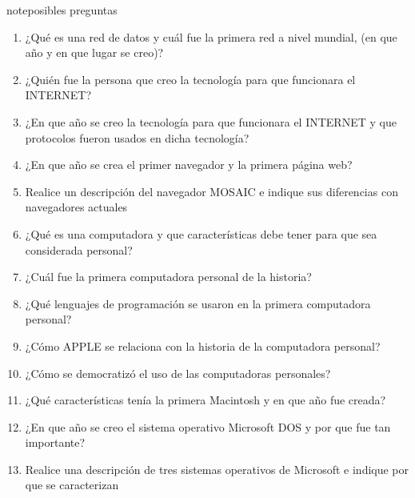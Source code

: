 \documentclass[letterpaper,10pt,spanish]{sphinxmanual}
\begin{document}
\begin{sphinxadmonition}{note}{posibles preguntas}
\begin{enumerate}
%
\item {} 
\sphinxAtStartPar
¿Qué es una red de datos y cuál fue la primera red a nivel mundial, (en que año y en que lugar se creo)?

\item {} 
\sphinxAtStartPar
¿Quién fue la persona que creo la tecnología para que funcionara el INTERNET?

\item {} 
\sphinxAtStartPar
¿En que año se creo la tecnología para que funcionara el INTERNET y que protocolos fueron usados en dicha tecnología?

\item {} 
\sphinxAtStartPar
¿En que año se crea el primer navegador y la primera página web?

\item {} 
\sphinxAtStartPar
Realice un descripción del navegador MOSAIC e indique sus diferencias con navegadores actuales

\item {} 
\sphinxAtStartPar
¿Qué es una computadora y que características debe tener para que sea considerada personal?

\item {} 
\sphinxAtStartPar
¿Cuál fue la primera computadora personal de la historia?

\item {} 
\sphinxAtStartPar
¿Qué lenguajes de programación se usaron en la primera computadora personal?

\item {} 
\sphinxAtStartPar
¿Cómo APPLE se relaciona con la historia de la computadora personal?

\item {} 
\sphinxAtStartPar
¿Cómo se democratizó el uso de las computadoras personales?

\item {} 
\sphinxAtStartPar
¿Qué características tenía la primera Macintosh y en que año fue creada?

\item {} 
\sphinxAtStartPar
¿En que año se creo el sistema operativo Microsoft DOS y por que fue tan importante?

\item {} 
\sphinxAtStartPar
Realice una descripción de tres sistemas operativos de Microsoft e indique por que se caracterizan


\end{enumerate}
\end{sphinxadmonition}
\end{document}
